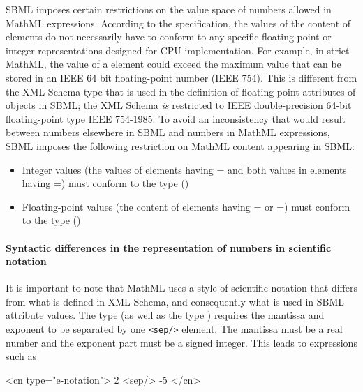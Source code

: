 SBML imposes certain restrictions on the value space of numbers
allowed in MathML expressions.  According to the \mathmltwo
specification, the values of the content of  elements do
not necessarily have to conform to any specific floating-point or
integer representations designed for CPU implementation.  For
example, in strict MathML, the value of a  element could
exceed the maximum value that can be stored in an IEEE 64 bit
floating-point number (IEEE 754).  This is different from the XML
Schema type  that is used in the definition of
floating-point attributes of objects in SBML; the XML Schema
 \emph{is} restricted to IEEE double-precision
64-bit floating-point type IEEE 754-1985.  To avoid an
inconsistency that would result between numbers elsewhere in SBML
and numbers in MathML expressions, SBML \thisLV imposes the
following restriction on MathML content appearing in SBML:
\begin{itemize}
  
\item Integer values (\ie the values of  elements
  having = and both values in  elements
  having =) must conform to the
   type
  ()
  
\item Floating-point values (\ie the content of 
  elements having = or
  =) must conform to the
   type
  ()
\end{itemize}


\paragraph{Syntactic differences in the representation of numbers
  in scientific notation}

It is important to note that MathML uses a style of scientific
notation that differs from what is defined in XML Schema, and
consequently what is used in SBML attribute values.  The
\mathmltwo type 
(as well as the type )
requires the mantissa and
exponent to be separated by one \texttt{<sep/>} element.  The
mantissa must be a real number and the exponent part must be a
signed integer.  This leads to expressions such as

\begin{example}
<cn type="e-notation"> 2 <sep/> -5 </cn>
\end{example}

